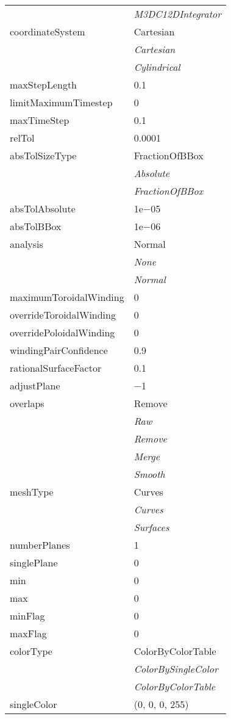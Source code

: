\documentclass[10pt,a4paper]{report}
\begin{document}
\begin{longtable}{ll}
 & {\it  M3DC12DIntegrator} \\
coordinateSystem  &  Cartesian   \\
 & {\it  Cartesian} \\
 & {\it  Cylindrical} \\
maxStepLength  &  0.1 \\
limitMaximumTimestep  &  0 \\
maxTimeStep  &  0.1 \\
relTol  &  0.0001 \\
absTolSizeType  &  FractionOfBBox   \\
 & {\it  Absolute} \\
 & {\it  FractionOfBBox} \\
absTolAbsolute  &  1e$-$05 \\
absTolBBox  &  1e$-$06 \\
analysis  &  Normal   \\
 & {\it  None} \\
 & {\it  Normal} \\
maximumToroidalWinding  &  0 \\
overrideToroidalWinding  &  0 \\
overridePoloidalWinding  &  0 \\
windingPairConfidence  &  0.9 \\
rationalSurfaceFactor  &  0.1 \\
adjustPlane  &  $-$1 \\
overlaps  &  Remove   \\
 & {\it  Raw} \\
 & {\it  Remove} \\
 & {\it  Merge} \\
 & {\it  Smooth} \\
meshType  &  Curves   \\
 & {\it  Curves} \\
 & {\it  Surfaces} \\
numberPlanes  &  1 \\
singlePlane  &  0 \\
min  &  0 \\
max  &  0 \\
minFlag  &  0 \\
maxFlag  &  0 \\
colorType  &  ColorByColorTable   \\
 & {\it  ColorBySingleColor} \\
 & {\it  ColorByColorTable} \\
singleColor  &  (0, 0, 0, 255) \\

\end{longtable}
\end{document}
